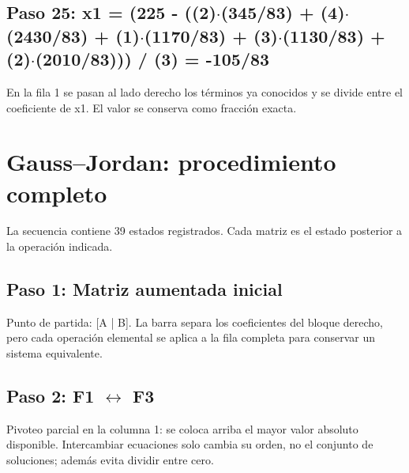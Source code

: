 \documentclass[conference]{IEEEtran}
\begin{document}
\medskip
\subsection*{Paso 25: x1 = (225 - ((2)\(\cdot\)(345/83) + (4)\(\cdot\)(2430/83) + (1)\(\cdot\)(1170/83) + (3)\(\cdot\)(1130/83) + (2)\(\cdot\)(2010/83))) / (3) = -105/83}
En la fila 1 se pasan al lado derecho los términos ya conocidos y se divide entre el coeficiente de x1. El valor se conserva como fracción exacta.


\medskip
\section{Gauss--Jordan: procedimiento completo}
La secuencia contiene 39 estados registrados. Cada matriz es el estado posterior a la operación indicada.
\subsection*{Paso 1: Matriz aumentada inicial}
Punto de partida: [A | B]. La barra separa los coeficientes del bloque derecho, pero cada operación elemental se aplica a la fila completa para conservar un sistema equivalente.


\medskip
\subsection*{Paso 2: F1 \(\leftrightarrow\) F3}
Pivoteo parcial en la columna 1: se coloca arriba el mayor valor absoluto disponible. Intercambiar ecuaciones solo cambia su orden, no el conjunto de soluciones; además evita dividir entre cero.
\end{document}
